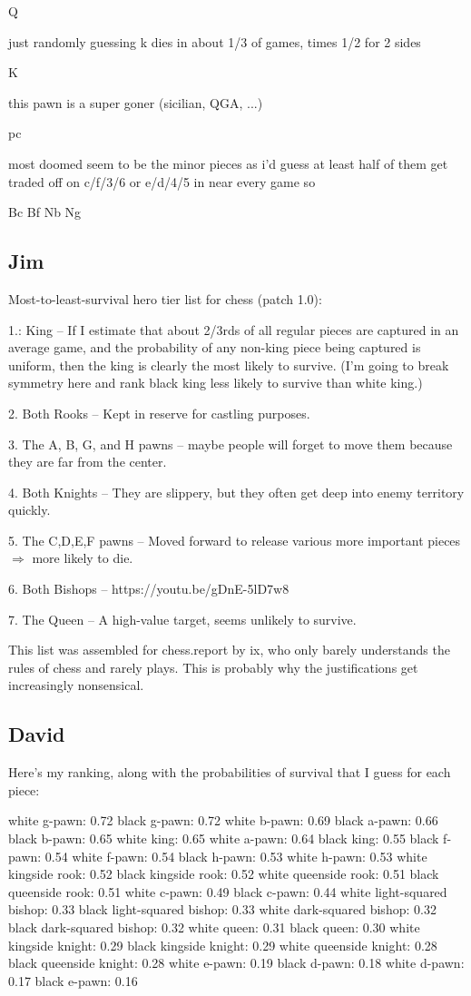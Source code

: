 \documentclass[twocolumn]{article}
\begin{document}
Q

just randomly guessing k dies in about 1/3 of games, times 1/2 for 2
sides

K

this pawn is a super goner (sicilian, QGA, ...)

pc

most doomed seem to be the minor pieces as i'd guess at least half of
them get traded off on c/f/3/6 or e/d/4/5 in near every game so

Bc
Bf
Nb
Ng

\subsection{Jim}

Most-to-least-survival hero tier list for chess (patch 1.0):

1.: King
 -- If I estimate that about 2/3rds of all regular pieces are captured in an average game, and the probability of any non-king piece being captured is uniform, then the king is clearly the most likely to survive. (I'm going to break symmetry here and rank black king less likely to survive than white king.)

2. Both Rooks
 -- Kept in reserve for castling purposes.

3. The A, B, G, and H pawns
 -- maybe people will forget to move them because they are far from the center.

4. Both Knights
 -- They are slippery, but they often get deep into enemy territory quickly.

5. The C,D,E,F pawns
 -- Moved forward to release various more important pieces $\Rightarrow$ more likely to die.

6. Both Bishops
 -- https://youtu.be/gDnE-5lD7w8

7. The Queen
 -- A high-value target, seems unlikely to survive.

This list was assembled for chess.report by ix, who only barely
understands the rules of chess and rarely plays. This is probably why
the justifications get increasingly nonsensical.

\subsection{David}

Here's my ranking, along with the probabilities of survival that I guess for each piece:

white g-pawn: 0.72
black g-pawn: 0.72
white b-pawn: 0.69
black a-pawn: 0.66
black b-pawn: 0.65
white king: 0.65
white a-pawn: 0.64
black king: 0.55
black f-pawn: 0.54
white f-pawn: 0.54
black h-pawn: 0.53
white h-pawn: 0.53
white kingside rook: 0.52
black kingside rook: 0.52
white queenside rook: 0.51
black queenside rook: 0.51
white c-pawn: 0.49
black c-pawn: 0.44
white light-squared bishop: 0.33
black light-squared bishop: 0.33
white dark-squared bishop: 0.32
black dark-squared bishop: 0.32
white queen: 0.31
black queen: 0.30
white kingside knight: 0.29
black kingside knight: 0.29
white queenside knight: 0.28
black queenside knight: 0.28
white e-pawn: 0.19
black d-pawn: 0.18
white d-pawn: 0.17
black e-pawn: 0.16
\end{document}
